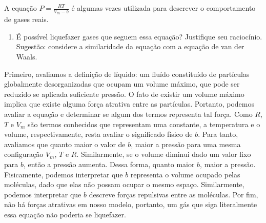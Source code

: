 \begin{xcs}
    A equação \( P = \frac{RT}{V_m - b} \) é algumas vezes utilizada para
    descrever o comportamento de gases reais. 
    \begin{enumerate}[label=\alph*.]
        \item É possível liquefazer gases que seguem essa equação? Justifique
            seu raciocínio. Sugestão: considere a similaridade da equação com a
            equação de van der Waals. 
    \end{enumerate}
\end{xcs}
\begin{rsl}
    Primeiro, avaliamos a definição de líquido: um fluído constituído de partículas
    globalmente desorganizadas que ocupam um volume máximo, que pode ser reduzido se
    aplicada suficiente pressão. O fato de existir um volume máximo implica que existe
    alguma força atrativa entre as partículas. Portanto, podemos avaliar a equação e 
    determinar se algum dos termos representa tal força.
    Como $R$, $T$ e $V_m$ são termos conhecidos que representam uma constante, a temperatura
    e o volume, respectivamente, resta avaliar o significado físico de $b$. Para tanto, avaliamos que quanto maior
    o valor de $b$, maior a pressão para uma mesma configuração $V_m$, $T$ e $R$. Similarmente, se 
    o volume diminui dado um valor fixo para $b$, então a pressão aumenta. Dessa forma, quanto maior
    $b$, maior a pressão. Fisicamente, podemos interpretar que $b$ representa o volume ocupado pelas
    moléculas, dado que elas não possam ocupar o mesmo espaço. Similarmente, podemos interpretar que 
    $b$ descreve forças repulsivas entre as moléculas. 
    Por fim, não há forças atrativas em nosso modelo, portanto, um gás que siga literalmente essa 
    equação não poderia se liquefazer.      

\end{rsl}
